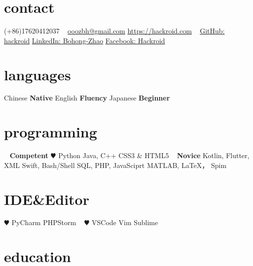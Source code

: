 \documentclass[hidelinks__VERSION__]{adamyi-cv}
\begin{document}



\begin{aside} %
\section{contact}
(+86)17620412037
~
\href{mailto:ooozbh@gmail.com}{ooozbh@gmail.com}
\href{https://hackroid.com}{https://hackroid.com}
~
\href{https://github.com/hackroid}{GitHub: hackroid}
\href{https://www.linkedin.com/in/%E5%8D%9A%E5%BC%98-%E8%B5%B5-b7ab09136/}{LinkedIn: Bohong-Zhao}
\href{https://www.facebook.com/Hackro1d}{Facebook: Hackroid}
\section{languages}
Chinese \textbf{Native}
English \textbf{Fluency}
Japanese \textbf{Beginner}
\section{programming}
~
\textbf{Competent}
{\color{red} $\varheart$} Python
Java, C++
CSS3 \& HTML5
~
\textbf{Novice}
Kotlin, Flutter, XML
Swift, Bash/Shell
SQL, PHP, JavaSciprt
MATLAB, \LaTeX， Spim
\section{IDE\&Editor}
{\color{red} $\varheart$} PyCharm
PHPStorm
~
{\color{red} $\varheart$} VSCode
Vim
Sublime
\versionsection
\end{aside}


\section{education}
\end{document}
